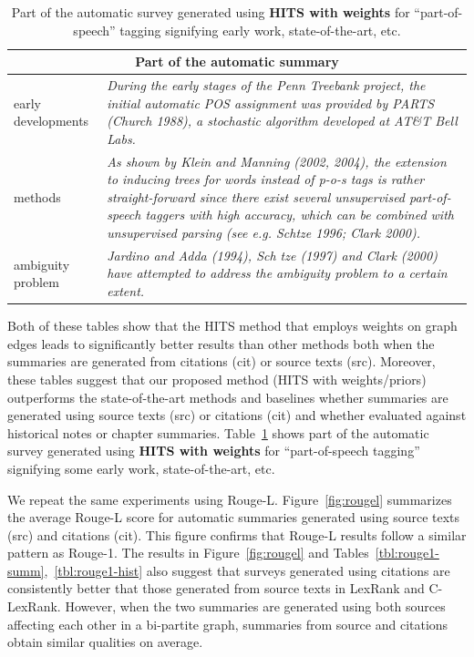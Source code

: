 \begin{table}
\centering
{\scriptsize
\begin{tabular}{p{1cm}p{6cm}} \hline
\multicolumn{2}{c}{{\bf Part of the automatic summary}}\\ \hline
early developments & {\it During the early stages of the Penn Treebank project, the initial automatic POS assignment was provided by PARTS (Church 1988), a stochastic algorithm developed at AT\&T Bell Labs.}\\ [1.5ex]
methods & {\it As shown by Klein and Manning (2002, 2004), the extension to inducing trees for words instead of p-o-s tags is rather straight-forward since there exist several unsupervised part-of-speech taggers with high accuracy, which can be combined with unsupervised parsing (see e.g. Schtze 1996; Clark 2000).}\\ [1.5ex]
ambiguity problem &  {\it Jardino and Adda (1994), Sch tze (1997) and Clark (2000) have attempted to address the ambiguity problem to a certain extent.}\\ \hline
\end{tabular}}
\caption{Part of the automatic survey generated using {\bf HITS with weights} for ``part-of-speech'' tagging signifying early work, state-of-the-art, etc.}\label{tbl:outeg}
\end{table}

Both of these tables show that the HITS method that employs weights on graph edges leads to significantly better results than other methods both when the summaries are generated from citations (cit) or source texts (src). Moreover, these tables suggest that our proposed method (HITS with weights/priors) outperforms the state-of-the-art methods and baselines whether summaries are generated using source texts (src) or citations (cit) and whether evaluated against historical notes or chapter summaries.
Table~\ref{tbl:outeg} shows part of the automatic survey generated using {\bf HITS with weights} for ``part-of-speech tagging'' signifying some early work, state-of-the-art, etc.

We repeat the same experiments using Rouge-L. Figure~\ref{fig:rougel} summarizes the average Rouge-L score for automatic summaries generated using source texts (src) and citations (cit). This figure confirms that Rouge-L results follow a similar pattern as Rouge-1. 
The results in Figure~\ref{fig:rougel} and Tables~\ref{tbl:rouge1-summ},~\ref{tbl:rouge1-hist} also suggest that surveys generated using citations are consistently better that those generated from source texts in LexRank and C-LexRank. However, when the two summaries are generated using both sources affecting each other in a bi-partite graph, summaries from source and citations obtain similar qualities on average.

